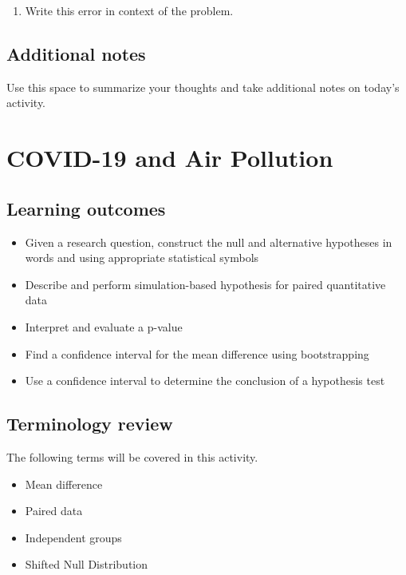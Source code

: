 \documentclass[
]{report}
\providecommand{\tightlist}{%
  \setlength{\itemsep}{0pt}\setlength{\parskip}{0pt}}
\begin{document}
\begin{enumerate}
\def\labelenumi{\arabic{enumi}.}
\setcounter{enumi}{27}
\tightlist
\item
  Write this error in context of the problem.
\end{enumerate}

\vspace{1in}

\hypertarget{additional-notes}{%
\section{Additional notes}\label{additional-notes}}

Use this space to summarize your thoughts and take additional notes on today's activity.

\hypertarget{covid-19-and-air-pollution}{%
\chapter{COVID-19 and Air Pollution}\label{covid-19-and-air-pollution}}

\hypertarget{learning-outcomes}{%
\section{Learning outcomes}\label{learning-outcomes}}

\begin{itemize}
\item
  Given a research question, construct the null and alternative hypotheses
  in words and using appropriate statistical symbols
\item
  Describe and perform simulation-based hypothesis for paired quantitative data
\item
  Interpret and evaluate a p-value
\item
  Find a confidence interval for the mean difference using bootstrapping
\item
  Use a confidence interval to determine the conclusion of a hypothesis test
\end{itemize}

\hypertarget{terminology-review}{%
\section{Terminology review}\label{terminology-review}}

The following terms will be covered in this activity.

\begin{itemize}
\item
  Mean difference
\item
  Paired data
\item
  Independent groups
\item
  Shifted Null Distribution
\end{itemize}
\end{document}

